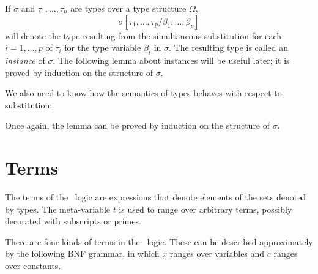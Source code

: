 If $\sigma$ and $\tau_1,\ldots,\tau_n$ are types over a type structure
$\Omega$,
\[
\sigma[\tau_{1},\ldots,\tau_{p}/\beta_{1},\ldots,\beta_{p}]
\]
will denote the type resulting from the simultaneous substitution for
each $i=1,\ldots,p$ of
$\tau_i$ for the type variable $\beta_i$ in $\sigma$.
The resulting type is called an {\it instance\/} of $\sigma$. The
following lemma about instances will be useful later; it is proved by
induction on the structure of $\sigma$.

\medskip


\medskip

We also need to know how the semantics of types behaves with respect
to substitution:

\medskip

Once again, the lemma can be proved by induction on the structure of
$\sigma$.

\section{Terms}
\label{terms}

The terms of the \HOL\ logic are expressions that denote elements of the sets
denoted by types. The meta-variable $t$
is used to range over arbitrary terms, possibly decorated
with subscripts or primes.

There are four kinds of terms in the \HOL\ logic. These can be
described approximately by the following {\small BNF} grammar, in
which $x$ ranges over variables and $c$ ranges over constants.


